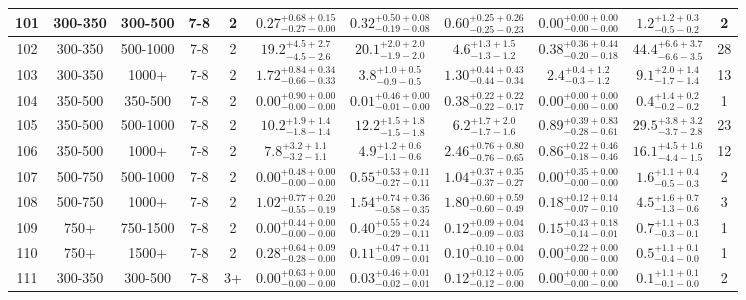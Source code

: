 \documentclass[11pt, oneside]{article}
\begin{document}
\begin{table}
{\begin{tabular}{ |c|c|c|c|c||c|c|c|c||c|c| }
101 & 300-350 & 300-500 & 7-8 & 2 & $0.27^{+0.68+0.15}_{-0.27-0.00}$ & $0.32^{+0.50+0.08}_{-0.19-0.08}$ & $0.60^{+0.25+0.26}_{-0.25-0.23}$ & $0.00^{+0.00+0.00}_{-0.00-0.00}$ & $1.2^{+1.2+0.3}_{-0.5-0.2}$ & 2 \\ \hline
102 & 300-350 & 500-1000 & 7-8 & 2 & $19.2^{+4.5+2.7}_{-4.5-2.6}$ & $20.1^{+2.0+2.0}_{-1.9-2.0}$ & $4.6^{+1.3+1.5}_{-1.3-1.2}$ & $0.38^{+0.36+0.44}_{-0.20-0.18}$ & $44.4^{+6.6+3.7}_{-6.6-3.5}$ & 28 \\ \hline
103 & 300-350 & 1000+ & 7-8 & 2 & $1.72^{+0.84+0.34}_{-0.66-0.33}$ & $3.8^{+1.0+0.5}_{-0.9-0.5}$ & $1.30^{+0.44+0.43}_{-0.44-0.34}$ & $2.4^{+0.4+1.2}_{-0.3-1.2}$ & $9.1^{+2.0+1.4}_{-1.7-1.4}$ & 13 \\ \hline
104 & 350-500 & 350-500 & 7-8 & 2 & $0.00^{+0.90+0.00}_{-0.00-0.00}$ & $0.01^{+0.46+0.00}_{-0.01-0.00}$ & $0.38^{+0.22+0.22}_{-0.22-0.17}$ & $0.00^{+0.00+0.00}_{-0.00-0.00}$ & $0.4^{+1.4+0.2}_{-0.2-0.2}$ & 1 \\ \hline
105 & 350-500 & 500-1000 & 7-8 & 2 & $10.2^{+1.9+1.4}_{-1.8-1.4}$ & $12.2^{+1.5+1.8}_{-1.5-1.8}$ & $6.2^{+1.7+2.0}_{-1.7-1.6}$ & $0.89^{+0.39+0.83}_{-0.28-0.61}$ & $29.5^{+3.8+3.2}_{-3.7-2.8}$ & 23 \\ \hline
106 & 350-500 & 1000+ & 7-8 & 2 & $7.8^{+3.2+1.1}_{-3.2-1.1}$ & $4.9^{+1.2+0.6}_{-1.1-0.6}$ & $2.46^{+0.76+0.80}_{-0.76-0.65}$ & $0.86^{+0.22+0.46}_{-0.18-0.46}$ & $16.1^{+4.5+1.6}_{-4.4-1.5}$ & 12 \\ \hline
107 & 500-750 & 500-1000 & 7-8 & 2 & $0.00^{+0.48+0.00}_{-0.00-0.00}$ & $0.55^{+0.53+0.11}_{-0.27-0.11}$ & $1.04^{+0.37+0.35}_{-0.37-0.27}$ & $0.00^{+0.35+0.00}_{-0.00-0.00}$ & $1.6^{+1.1+0.4}_{-0.5-0.3}$ & 2 \\ \hline
108 & 500-750 & 1000+ & 7-8 & 2 & $1.02^{+0.77+0.20}_{-0.55-0.19}$ & $1.54^{+0.74+0.36}_{-0.58-0.35}$ & $1.80^{+0.60+0.59}_{-0.60-0.49}$ & $0.18^{+0.12+0.14}_{-0.07-0.10}$ & $4.5^{+1.6+0.7}_{-1.3-0.6}$ & 3 \\ \hline
109 & 750+ & 750-1500 & 7-8 & 2 & $0.00^{+0.44+0.00}_{-0.00-0.00}$ & $0.40^{+0.55+0.24}_{-0.29-0.11}$ & $0.12^{+0.09+0.04}_{-0.09-0.03}$ & $0.15^{+0.43+0.18}_{-0.14-0.01}$ & $0.7^{+1.1+0.3}_{-0.3-0.1}$ & 1 \\ \hline
110 & 750+ & 1500+ & 7-8 & 2 & $0.28^{+0.64+0.09}_{-0.28-0.00}$ & $0.11^{+0.47+0.11}_{-0.09-0.01}$ & $0.10^{+0.10+0.04}_{-0.10-0.00}$ & $0.00^{+0.22+0.00}_{-0.00-0.00}$ & $0.5^{+1.1+0.1}_{-0.4-0.0}$ & 1 \\ \hline
111 & 300-350 & 300-500 & 7-8 & 3+ & $0.00^{+0.63+0.00}_{-0.00-0.00}$ & $0.03^{+0.46+0.01}_{-0.02-0.01}$ & $0.12^{+0.12+0.05}_{-0.12-0.00}$ & $0.00^{+0.00+0.00}_{-0.00-0.00}$ & $0.1^{+1.1+0.1}_{-0.1-0.0}$ & 2 \\ \hline

\end{tabular}}
\end{table}
\end{document}
